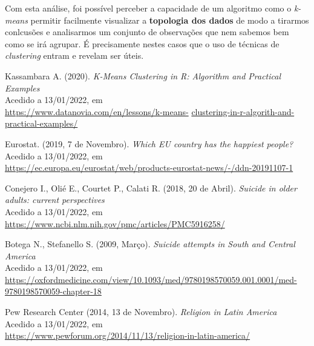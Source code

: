 \documentclass[a4paper,12pt]{article}
\begin{document}
Com esta análise, foi possível perceber a capacidade de um algoritmo como o \textit{k-means} permitir facilmente visualizar a \textbf{topologia dos dados} de modo a tirarmos conlcusões e analisarmos um conjunto de observações que nem sabemos bem como se irá agrupar. É precisamente nestes casos que o uso de técnicas de \textit{clustering} entram e revelam ser úteis.

\newpage
\begin{thebibliography}{1}

Kassambara A. (2020). \textit{K-Means Clustering in R: Algorithm and Practical Examples} \\
Acedido a 13/01/2022, em \\
\url{https://www.datanovia.com/en/lessons/k-means-} \url{clustering-in-r-algorith-and-practical-examples/}

Eurostat. (2019, 7 de Novembro). \textit{Which EU country has the happiest people?}
Acedido a 13/01/2022, em \\
\url{https://ec.europa.eu/eurostat/web/products-eurostat-news/-/ddn-20191107-1}


Conejero I., Olié E., Courtet P., Calati R. (2018, 20 de Abril). \textit{Suicide in older adults: current perspectives} \\
Acedido a 13/01/2022, em \\
\url{https://www.ncbi.nlm.nih.gov/pmc/articles/PMC5916258/}

Botega N., Stefanello S. (2009, Março). \textit{Suicide attempts in South and Central America} \\
Acedido a 13/01/2022, em \\
\url{https://oxfordmedicine.com/view/10.1093/med/9780198570059.001.0001/med-9780198570059-chapter-18}

Pew Research Center (2014, 13 de Novembro). \textit{Religion in Latin America} \\
Acedido a 13/01/2022, em \\
\url{https://www.pewforum.org/2014/11/13/religion-in-latin-america/}

\end{thebibliography}
\end{document}
